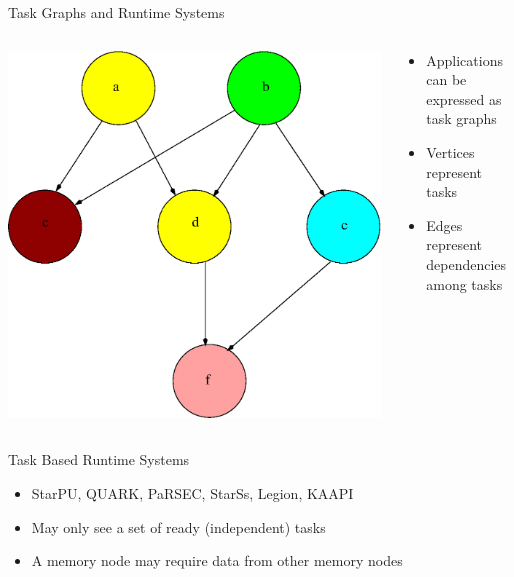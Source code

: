 \documentclass[mathserif,hyperref={pdfpagemode=FullScreen}]{beamer}
\begin{document}
\begin{frame}{Task Graphs and Runtime Systems}
		\begin{columns}
	\null \hfill
	\begin{column}{0.4\linewidth}
		\begin{center}
			\includegraphics[scale=0.2]{diagrams/taskGraph.eps}
		\end{center}
	\end{column}
	\begin{column}{0.5\linewidth}
		\begin{itemize}
			   	 \item Applications can be expressed as task graphs
			   	 \item Vertices represent tasks
			   	 \item Edges represent dependencies among tasks
		\end{itemize}
	\end{column}
\end{columns}
\begin{block}{Task Based Runtime Systems}
		\begin{itemize}
	\item StarPU, QUARK, PaRSEC, StarSs, Legion, KAAPI
	\item May only see a set of ready (independent) tasks
	\item A memory node may require data from other memory nodes 


\end{itemize}
\end{block}
\end{frame}
\end{document}
